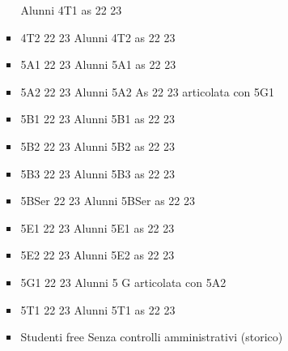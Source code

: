 \begin{itemize}
\begin{itemize}
\begin{itemize}
	Alunni 4T1 as 22 23	
	\item 4T2 22 23
	Alunni 4T2 as 22 23	
	\item 5A1 22 23
	Alunni 5A1 as 22 23	
	\item 5A2 22 23
	Alunni 5A2 As 22 23 articolata con 5G1	
	\item 5B1 22 23
	Alunni 5B1 as 22 23	
	\item 5B2 22 23
	Alunni 5B2 as 22 23	
	\item 5B3 22 23
	Alunni 5B3 as 22 23	
	\item 5BSer 22 23
	Alunni 5BSer as 22 23	
	\item 5E1 22 23
	Alunni 5E1 as 22 23	
	\item 5E2 22 23
	Alunni 5E2 as 22 23	
	\item 5G1 22 23
	Alunni 5 G articolata con 5A2	
	\item 5T1 22 23
	Alunni 5T1 as 22 23	
	\item Studenti free
	Senza controlli amministrativi (storico)
\end{itemize}
	\end{itemize}
\end{itemize} 